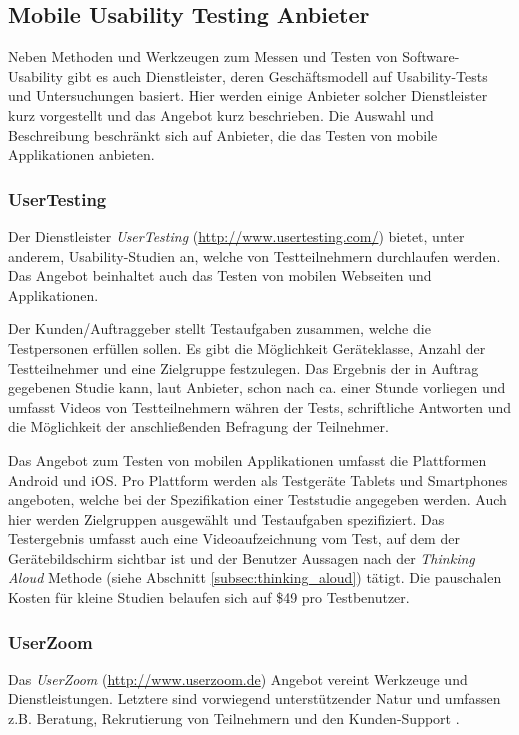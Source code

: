 \subsection{Mobile Usability Testing Anbieter\label{subsec:usability_testing_anbieter}}
Neben Methoden und Werkzeugen zum Messen und Testen von Software-Usability gibt es auch Dienstleister, deren Geschäftsmodell auf Usability-Tests und Untersuchungen basiert.
Hier werden einige Anbieter solcher Dienstleister kurz vorgestellt und das Angebot kurz beschrieben.
Die Auswahl und Beschreibung beschränkt sich auf Anbieter, die das Testen von mobile Applikationen anbieten.

\subsubsection{UserTesting\label{subsubsec:usertesting}}
Der Dienstleister \emph{UserTesting} (\url{http://www.usertesting.com/}) bietet, unter anderem, Usability-Studien an, welche von Testteilnehmern durchlaufen werden.
Das Angebot beinhaltet auch das Testen von mobilen Webseiten und Applikationen. \cite[Vgl.][]{UserTesting.2014c}

Der Kunden/Auftraggeber stellt Testaufgaben zusammen, welche die Testpersonen erfüllen sollen.
Es gibt die Möglichkeit Geräteklasse, Anzahl der Testteilnehmer und eine Zielgruppe festzulegen.
Das Ergebnis der in Auftrag gegebenen Studie kann, laut Anbieter, schon nach ca. einer Stunde vorliegen und umfasst Videos von Testteilnehmern währen der Tests, schriftliche Antworten und die Möglichkeit der anschließenden Befragung der Teilnehmer. \cite[Vgl.][]{UserTesting.2014b}

Das Angebot zum Testen von mobilen Applikationen umfasst die Plattformen Android und iOS.
Pro Plattform werden als Testgeräte Tablets und Smartphones angeboten, welche bei der Spezifikation einer Teststudie angegeben werden. 
Auch hier werden Zielgruppen ausgewählt und Testaufgaben spezifiziert.
Das Testergebnis umfasst auch eine Videoaufzeichnung vom Test, auf dem der Gerätebildschirm sichtbar ist und der Benutzer Aussagen nach der \emph{Thinking Aloud} Methode (siehe Abschnitt \ref{subsec:thinking_aloud}) tätigt.
Die pauschalen Kosten für kleine Studien belaufen sich auf \$49 pro Testbenutzer.
\cite[Vgl.][]{UserTesting.2014}

\subsubsection{UserZoom \label{subsubsec:userzoom}}
Das \emph{UserZoom} (\url{http://www.userzoom.de}) Angebot vereint Werkzeuge und Dienstleistungen.
Letztere sind vorwiegend unterstützender Natur und umfassen z.B. Beratung, Rekrutierung von Teilnehmern und den Kunden-Support \cite[vgl.][]{UserZoomGmbH.2013b}.

